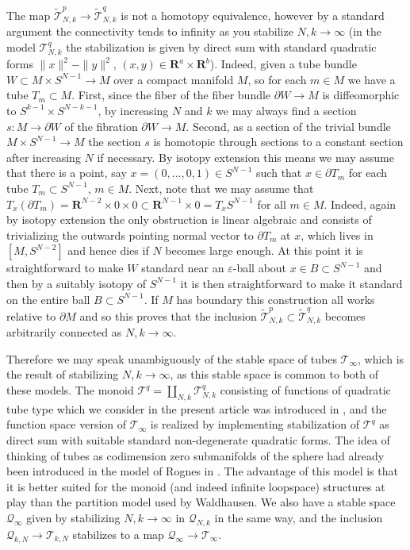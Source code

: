 \documentclass{amsart}
\newcommand\cQ{\mathcal{Q}}
\newcommand\cT{\mathcal{T}}
\def\bR{\mathbf{R}}
\theoremstyle{definition}
\theoremstyle{remark}
\newtheorem{inductive lemma}[theorem]{Inductive Lemma}
\begin{document}
The map $\widetilde{\cT}_{N,k}^p \to \widetilde{\cT}^q_{N,k}$ is not a homotopy equivalence, however by a standard argument the connectivity tends to infinity as you stabilize $N,k \to \infty$ (in the model $\cT_{N,k}^q$ the stabilization is given by direct sum with standard quadratic forms $\|x\|^2-\|y\|^2$, $(x,y) \in \bR^a \times \bR^b$). Indeed, given a tube bundle $W \subset M \times S^{N-1} \to M$ over a compact manifold $M$, so for each $m \in M$ we have a tube $T_m \subset M$. First, since the fiber of the fiber bundle $\partial W \to M$ is diffeomorphic to $S^{k-1} \times S^{N-k-1}$, by increasing $N$ and $k$ we may always find a section $s:M \to \partial W$ of the fibration $\partial W \to M$. Second, as a section of the trivial bundle $M \times S^{N-1}  \to M$ the section $s$ is homotopic through sections to a constant section after increasing $N$ if necessary. By isotopy extension this means we may assume that there is a point, say $x=(0,\ldots,0,1) \in S^{N-1}$ such that $x \in \partial T_m$ for each tube $T_m \subset S^{N-1}$, $m \in M$. Next, note that we may assume that $T_x (\partial T_m) = \bR^{N-2} \times 0 \times 0 \subset \bR^{N-1} \times 0 =  T_xS^{N-1}$ for all $m \in M$. Indeed, again by isotopy extension the only obstruction is linear algebraic and consists of trivializing the outwards pointing normal vector to $\partial T_m$ at $x$, which lives in $[M,S^{N-2}]$ and hence dies if $N$ becomes large enough. At this point it is straightforward to make $W$ standard near an $\varepsilon$-ball about $x \in B \subset S^{N-1}$ and then by a suitably isotopy of $S^{N-1}$ it is then straightforward to make it standard on the entire ball $B \subset S^{N-1}$. If $M$ has boundary this construction all works relative to $\partial M$ and so this proves that the inclusion $\widetilde{\cT}_{N,k}^p\subset \widetilde{\cT}^q_{N,k}$ becomes arbitrarily connected as $N,k \to \infty$.


Therefore we may speak unambiguously of the stable space of tubes $\cT_\infty$, which is the result of stabilizing $N,k\to \infty$, as this stable space is common to both of these models. The monoid $\cT^q=\coprod_{N,k} \cT_{N,k}^q$ consisting of functions of quadratic tube type which we consider in the present article was introduced in \cite{AACK}, and the function space version of $\cT_\infty$ is realized by implementing stabilization of $\cT^q$ as direct sum with suitable standard non-degenerate quadratic forms. The idea of thinking of tubes as codimension zero submanifolds of the sphere had already been introduced in the model of Rognes in \cite{R92}. The advantage of this model is that it is better suited for the monoid (and indeed infinite loopspace) structures at play than the partition model used by Waldhausen. We also have a stable space $\cQ_\infty$ given by stabilizing $N,k \to \infty$ in $\cQ_{N,k}$ in the same way, and the inclusion $\cQ_{k,N} \to \cT_{k,N}$ stabilizes to a map $\cQ_\infty \to \cT_\infty$.
\end{document}
